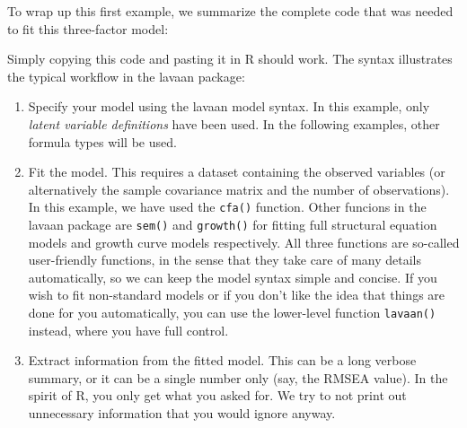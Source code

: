 To wrap up this first example, we summarize the complete code that was
needed to fit this three-factor model:

\begin{Shaded}
\begin{Highlighting}[]


\StringTok{ }

\NormalTok{)}
\end{Highlighting}
\end{Shaded}

Simply copying this code and pasting it in R should work. The syntax
illustrates the typical workflow in the lavaan package:

\begin{enumerate}
\def\labelenumi{\arabic{enumi}.}
\item
  Specify your model using the lavaan model syntax. In this example,
  only \emph{latent variable definitions} have been used. In the
  following examples, other formula types will be used.
\item
  Fit the model. This requires a dataset containing the observed
  variables (or alternatively the sample covariance matrix and the
  number of observations). In this example, we have used the
  \texttt{cfa()} function. Other funcions in the lavaan package are
  \texttt{sem()} and \texttt{growth()} for fitting full structural
  equation models and growth curve models respectively. All three
  functions are so-called user-friendly functions, in the sense that
  they take care of many details automatically, so we can keep the model
  syntax simple and concise. If you wish to fit non-standard models or
  if you don't like the idea that things are done for you automatically,
  you can use the lower-level function \texttt{lavaan()} instead, where
  you have full control.
\item
  Extract information from the fitted model. This can be a long verbose
  summary, or it can be a single number only (say, the RMSEA value). In
  the spirit of R, you only get what you asked for. We try to not print
  out unnecessary information that you would ignore anyway.
\end{enumerate}
